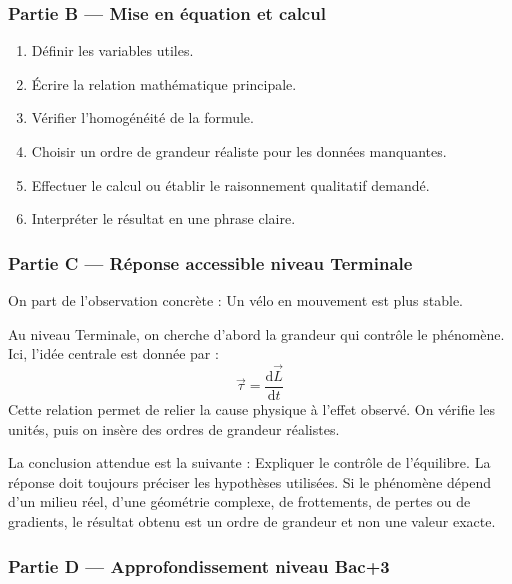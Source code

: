 \documentclass[11pt,a4paper]{article}
\begin{document}
\subsubsection*{Partie B — Mise en équation et calcul}

\begin{enumerate}
  \item Définir les variables utiles.
  \item Écrire la relation mathématique principale.
  \item Vérifier l'homogénéité de la formule.
  \item Choisir un ordre de grandeur réaliste pour les données manquantes.
  \item Effectuer le calcul ou établir le raisonnement qualitatif demandé.
  \item Interpréter le résultat en une phrase claire.
\end{enumerate}

\subsubsection*{Partie C — Réponse accessible niveau Terminale}

\begin{corrigebox}
On part de l'observation concrète : Un vélo en mouvement est plus stable.

Au niveau Terminale, on cherche d'abord la grandeur qui contrôle le phénomène. Ici, l'idée centrale est donnée par :
\[
\vec\tau=\frac{\mathrm d\vec L}{\mathrm dt}
\]
Cette relation permet de relier la cause physique à l'effet observé. On vérifie les unités, puis on insère des ordres de grandeur réalistes.

La conclusion attendue est la suivante : Expliquer le contrôle de l'équilibre. La réponse doit toujours préciser les hypothèses utilisées. Si le phénomène dépend d'un milieu réel, d'une géométrie complexe, de frottements, de pertes ou de gradients, le résultat obtenu est un ordre de grandeur et non une valeur exacte.
\end{corrigebox}

\subsubsection*{Partie D — Approfondissement niveau Bac+3}
\end{document}
